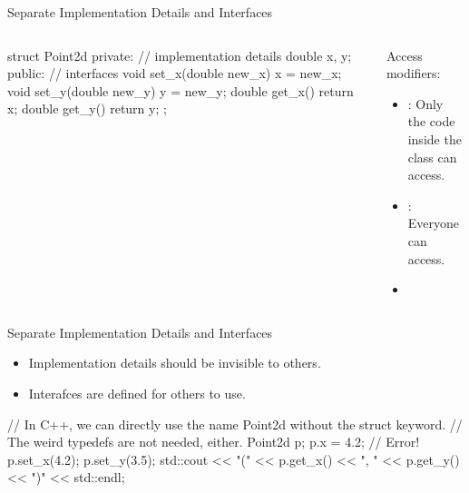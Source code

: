 \documentclass{beamer}
\begin{document}
\begin{frame}[fragile]{Separate Implementation Details and Interfaces}
    \begin{columns}
        \begin{column}{0.5\linewidth}
            \begin{cpp}
struct Point2d {
 private:
  // implementation details
  double x, y;
 public:
  // interfaces
  void set_x(double new_x)
    { x = new_x; }
  void set_y(double new_y)
    { y = new_y; }
  double get_x()
    { return x; }
  double get_y()
    { return y; }
};
            \end{cpp}   
        \end{column}
        \begin{column}{0.5\linewidth}
            Access modifiers:
            \begin{itemize}
                \item {}: Only the code inside the class  can access.
                \item {}: Everyone can access.
                \item {}
            \end{itemize}
        \end{column}
    \end{columns}
\end{frame}

\begin{frame}[fragile]{Separate Implementation Details and Interfaces}
    \begin{itemize}
        \item Implementation details should be invisible to others.
        \item Interafces are defined for others to use.
    \end{itemize}
    \begin{center}
        \begin{cpp}
// In C++, we can directly use the name Point2d without the struct keyword.
// The weird typedefs are not needed, either.
Point2d p;
p.x = 4.2;  // Error!
p.set_x(4.2);
p.set_y(3.5);
std::cout << "(" << p.get_x() << ", "
          << p.get_y() << ")" << std::endl;
        \end{cpp}    
    \end{center}
\end{frame}
\end{document}
